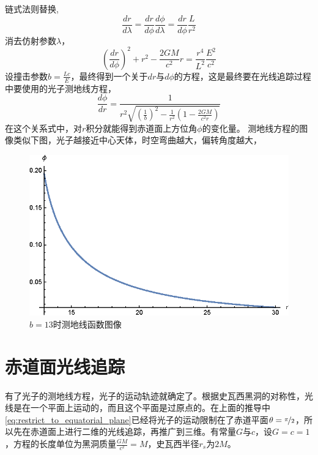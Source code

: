 链式法则替换,
\begin{equation}
    \frac{dr}{d\lambda}=\frac{dr}{d\phi}\frac{d\phi}{d\lambda}=\frac{dr}{d\phi}\frac{L}{r^{2}}
\end{equation}
消去仿射参数$\lambda$，
\begin{equation}
    \left(\frac{dr}{d\phi}\right)^{2}+r^{2}-\frac{2GM}{c^{2}}r=\frac{r^{4}}{L^{2}}\frac{E^{2}}{c^{2}}
\end{equation}
设撞击参数$b=\frac{Lc}{E}$，最终得到一个关于$dr$与$d\phi$的方程，这是最终要在光线追踪过程中要使用的光子测地线方程，
\begin{equation}
    \frac{d\phi}{dr}=\frac{1}{r^{2}\sqrt{\left(\frac{1}{b}\right)^{2}-\frac{1}{r^{2}}\left(1-\frac{2GM}{c^{2}r}\right)}}\label{eq:geodesic}
\end{equation}
在这个关系式中，对$r$积分就能得到赤道面上方位角$\phi$的变化量。
测地线方程的图像类似下图，光子越接近中心天体，时空弯曲越大，偏转角度越大，
\begin{figure}[H]
    \centering
    \includegraphics{images/geodesic.eps}
    \caption{$b=13$时测地线函数图像}\label{fig:geodesic} %
\end{figure}

\section{赤道面光线追踪}
有了光子的测地线方程，光子的运动轨迹就确定了。根据史瓦西黑洞的对称性，光线是在一个平面上运动的，而且这个平面是过原点的。在上面的推导中\ref{eq:restrict_to_equatorial_plane}已经将光子的运动限制在了赤道平面$\theta=\nicefrac{\pi}{2}$，所以先在赤道面上进行二维的光线追踪，再推广到三维。有常量$G$与$c$，设$G=c=1$，方程的长度单位为黑洞质量$\frac{GM}{c^2}=M$，史瓦西半径$r_s$为$2M$。

